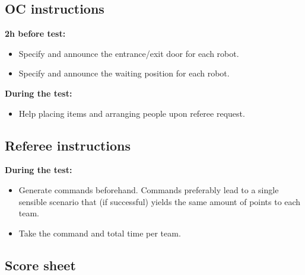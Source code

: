 \subsection{OC instructions}
\textbf{2h before test:}
\begin{itemize}
	\item Specify and announce the entrance/exit door for each robot. 
	\item Specify and announce the waiting position for each robot. 
\end{itemize}
\textbf{During the test:}
\begin{itemize}
	\item Help placing items and arranging people upon referee request.
\end{itemize}

\subsection{Referee instructions}
\textbf{During the test:}
\begin{itemize}
	\item Generate commands beforehand. Commands preferably lead to a single sensible scenario that (if successful) yields the same amount of points to each team. 
	\item Take the command and total time per team.
\end{itemize}


\newpage
\subsection{Score sheet}


 
